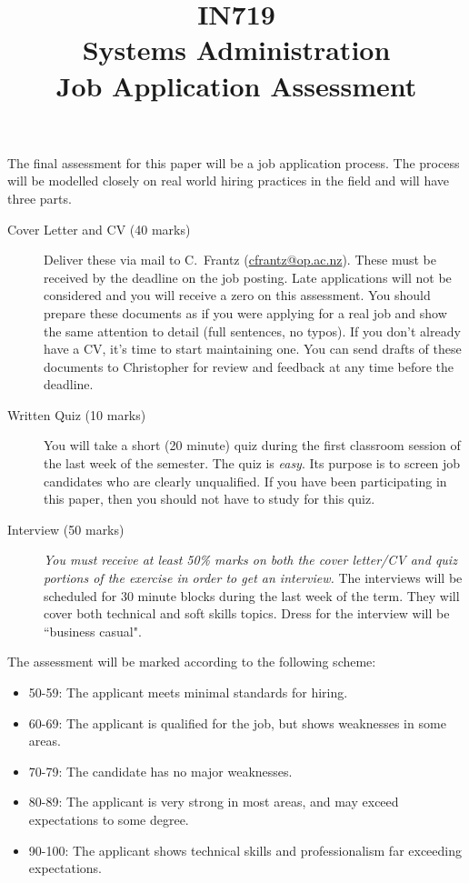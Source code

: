 \documentclass{article}   	%
\title{IN719\\Systems Administration\\Job Application Assessment}
\date{}
\begin{document}
\maketitle
The final assessment for this paper will be a job application process.  The process will be modelled closely on real world hiring practices in the field and will have three parts.


\begin{description}
\item[Cover Letter and CV (40 marks)] Deliver these via mail to C.~Frantz (\url{cfrantz@op.ac.nz}). These must be received by the deadline on the job posting.  Late applications will not be considered and you will receive a zero on this assessment.  You should prepare these documents as if you were applying for a real job and show the same attention to detail (full sentences, no typos).  If you don't already have a CV, it's time to start maintaining one.  You can send drafts of these documents to Christopher for review and feedback at any time before the deadline.

\item[Written Quiz (10 marks)] You will take a short (20 minute) quiz during the first classroom session of the last week of the semester.  The quiz is \emph{easy}.  Its purpose is to screen job candidates who are clearly unqualified.  If you have been participating in this paper, then you should not have to study for this quiz.

\item[Interview (50 marks)] \emph{You must receive at least 50\% marks on both the cover letter/CV and quiz portions of the exercise in order to get an interview.} The interviews will be scheduled for 30 minute blocks during the last week of the term.  They will cover both technical and soft skills topics.  Dress for the interview will be ``business casual".  

\end{description}

The assessment will be marked according to the following scheme:
\begin{itemize}
\item 50-59:  The applicant meets minimal standards for hiring.  
\item 60-69:  The applicant is qualified for the job, but shows weaknesses in some areas.
\item 70-79:  The candidate has no major weaknesses. 
\item 80-89:  The applicant is very strong in most areas, and may exceed expectations to some degree. 
\item 90-100: The applicant shows technical skills and professionalism far exceeding expectations.  
\end{itemize}
\end{document}
